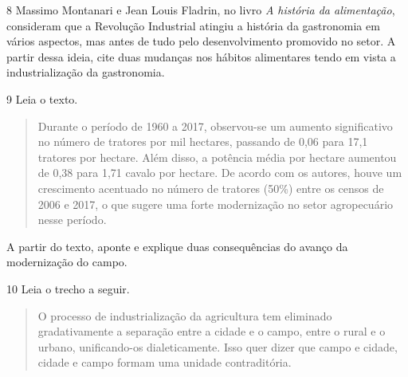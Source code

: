 
\num{8} Massimo Montanari e Jean Louis Fladrin, no livro \emph{A
história da alimentação}, consideram que a Revolução Industrial atingiu
a história da gastronomia em vários aspectos, mas antes de tudo pelo
desenvolvimento promovido no setor. A partir dessa ideia, cite duas
mudanças nos hábitos alimentares tendo em vista a industrialização da
gastronomia.


\num{9} Leia o texto.

\begin{quote}
Durante o período de 1960 a 2017, observou-se um aumento significativo
no número de tratores por mil hectares, passando de 0,06 para 17,1
tratores por hectare. Além disso, a potência média por hectare aumentou
de 0,38 para 1,71 cavalo por hectare. De acordo com os autores, houve um
crescimento acentuado no número de tratores (50\%) entre os censos de
2006 e 2017, o que sugere uma forte modernização no setor agropecuário
nesse período.
\end{quote}


A partir do texto, aponte e explique duas consequências do avanço da
modernização do campo.


\num{10} Leia o trecho a seguir.

\begin{quote}
O processo de industrialização da agricultura tem eliminado
gradativamente a separação entre a cidade e o campo, entre o rural e o
urbano, unificando-os dialeticamente. Isso quer dizer que campo e
cidade, cidade e campo formam uma unidade contraditória.
\end{quote}

